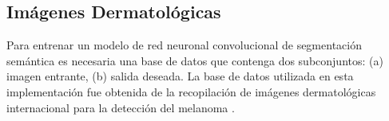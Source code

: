 \documentclass[a0,portrait]{a0poster}
\begin{document}
\begin{multicols}{3}
\section*{Imágenes Dermatológicas}
Para entrenar un modelo de red neuronal convolucional de segmentación semántica es necesaria una base de datos que contenga dos subconjuntos: (a) imagen entrante, (b) salida deseada. La base de datos utilizada en esta implementación fue obtenida de la recopilación de imágenes dermatológicas internacional para la detección del melanoma \citep{isic_skin}.

\begin{center}
\end{center}



\end{multicols}
\end{document}
